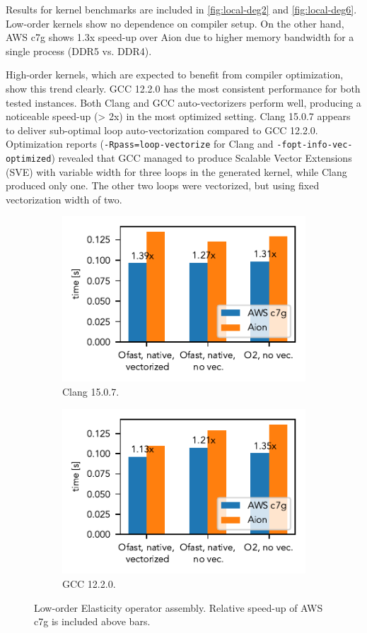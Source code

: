 Results for kernel benchmarks are included in \autoref{fig:local-deg2} and
\autoref{fig:local-deg6}. Low-order kernels show no dependence on compiler
setup. On the other hand, AWS c7g shows 1.3x speed-up over Aion due to higher
memory bandwidth for a single process (DDR5 vs. DDR4).

High-order kernels, which are expected to benefit from compiler optimization,
show this trend clearly. GCC 12.2.0 has the most consistent performance for both
tested instances. Both Clang and GCC auto-vectorizers perform well, producing a
noticeable speed-up (> 2x) in the most optimized setting. Clang 15.0.7 appears
to deliver sub-optimal loop auto-vectorization compared to GCC 12.2.0.
Optimization reports (\texttt{-Rpass=loop-vectorize} for Clang and
\texttt{-fopt-info-vec-optimized}) revealed that GCC managed to produce Scalable
Vector Extensions (SVE) with variable width for three loops in the generated
kernel, while Clang produced only one. The other two loops were vectorized, but
using fixed vectorization width of two.

\begin{figure}
    \begin{subfigure}{.5\textwidth}
        \centering
        \includegraphics{chapters/chp1/imgs/kernel_plots/local_operator_clang_deg2.pdf}
        \caption{Clang 15.0.7.}
        \label{fig:local-clang-deg2}
    \end{subfigure}%
    \begin{subfigure}{.5\textwidth}
        \centering
        \includegraphics{chapters/chp1/imgs/kernel_plots/local_operator_gcc_deg2.pdf}
        \caption{GCC 12.2.0.}
        \label{fig:local-gcc-deg2}
    \end{subfigure}
    \caption{Low-order Elasticity operator assembly. Relative speed-up of AWS
    c7g is included above bars.}
    \label{fig:local-deg2}
\end{figure}


